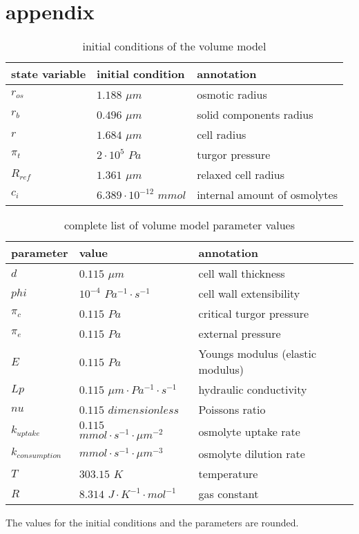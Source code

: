 \section{appendix}
\begin{table} [h]
	\footnotesize
	\begin{center} 
		\caption{initial conditions of the volume model}
		\begin{tabular} {l l l}
		\toprule
	 	\textbf{state variable} & \textbf{initial condition} & \textbf{annotation}  \\
	 	\midrule
	 	$r_{os}$ & $1.188$ $\mu m$ & osmotic radius\\
	 	$r_{b}$ & $0.496$ $\mu m$ &solid components radius\\
	 	$r$ & $1.684$ $\mu m$ & cell radius\\
	 	$\pi_t$ & $2 \cdot 10^5$ $Pa$ & turgor pressure\\
	 	$R_{ref}$ & $1.361$ $\mu m$ & relaxed cell radius \\
	 	$c_{i}$ & $6.389 \cdot 10^{-12}$ $mmol$ & internal amount of osmolytes\\
	 	\bottomrule
		\end{tabular}
		\label{initCondVolume}
	\end{center}
\end{table}

\begin{table} [h]
	\footnotesize
	\begin{center} 
		\caption{complete list of volume model parameter values}
		\begin{tabular} {l l l}
			\toprule
			\textbf{parameter} & \textbf{value} & \textbf{annotation}  \\
			\midrule
			$d$ & $0.115$ $\mu m$ & cell wall thickness\\
			$phi$ & $10^{-4}$ $Pa^{-1} \cdot s^{-1}$ & cell wall extensibility\\
			$\pi_c$ & $0.115$ $Pa$ & critical turgor pressure\\
			$\pi_e$ & $0.115$ $Pa$ & external pressure\\
			$E$ & $0.115$ $Pa$ & Youngs modulus (elastic modulus)\\
			$Lp$ & $0.115$ $\mu m \cdot Pa^{-1} \cdot s^{-1}$ & hydraulic conductivity\\
			$nu$ & $0.115$ $dimensionless$ & Poissons ratio\\
			$k_{uptake}$ & $0.115$ $mmol \cdot s^{-1} \cdot \mu m ^{-2} $ & osmolyte uptake rate\\
			$k_{consumption}$ & $mmol \cdot s^{-1} \cdot \mu m ^{-3} $ & osmolyte dilution rate\\
			$T$ & $303.15$ $K$ & temperature\\
			$R$ & $8.314$ $J \cdot K^{-1} \cdot mol^{-1}$ & gas constant \\
			\bottomrule
		\end{tabular}
		\label{parameterVolume}
	\end{center}
\end{table}
The values for the initial conditions and the parameters are rounded.

